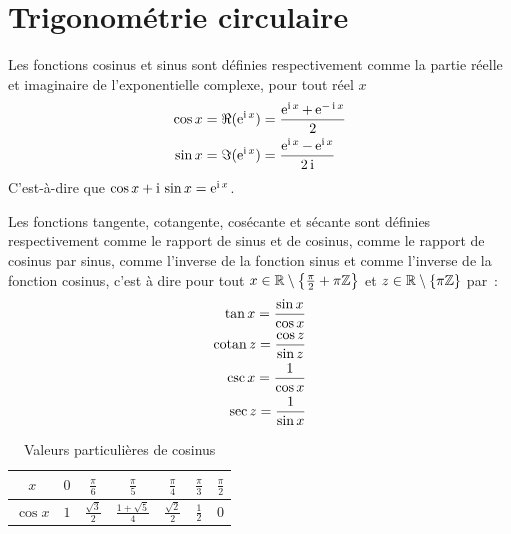\section{Trigonométrie circulaire}\label{sec:chap1-trigocirc}

\begin{defdef}
  Les fonctions cosinus et sinus sont définies respectivement comme la
  partie réelle et imaginaire de l'exponentielle complexe, pour tout réel
  \(x\)
  \begin{align*}
    \cos{x} &= \Re(\operatorname{e}^{\operatorname{i}{}x}) = \frac{\operatorname{e}^{\operatorname{i}{}x}+\operatorname{e}^{-\operatorname{i}{}x}}{2} \\
    \sin{x} & = \Im(\operatorname{e}^{\operatorname{i}{}x}) = \frac{\operatorname{e}^{\operatorname{i}{}x}-\operatorname{e}^{\operatorname{i}{}x}}{2\operatorname{i}}
  \end{align*}
  C'est-à-dire que \(\cos x +\operatorname{i}{}\sin x = \operatorname{e}^{\operatorname{i}{}x}\).
\end{defdef}

\begin{defdef}
  Les fonctions tangente, cotangente, cosécante et sécante sont définies
  respectivement comme le rapport de sinus et de cosinus, comme le rapport
  de cosinus par sinus, comme l'inverse de la fonction sinus et comme
  l'inverse de la fonction cosinus, c'est à dire pour tout \(x \in
  \mathbb{R}\setminus\left\{\frac{\pi}{2}+\pi\mathbb{Z}\right\}\) et \(z \in
  \mathbb{R}\setminus\left\{\pi\mathbb{Z} \right\}\) par~:
  \begin{align}
    \tan{x} = \frac{\sin{x}}{\cos{x}} \\ \operatorname{cotan}{z} = \frac{\cos{z}}{\sin{z}} \\
    \csc{x} = \frac{1}{\cos{x}} \\ \sec{z} = \frac{1}{\sin{x}}
  \end{align}
\end{defdef}

\renewcommand{\arraystretch}{1.5}
\begin{table}
  \centering
  \begin{tabular}{ccccccc}
    \toprule
    \(x\)      & \(0\) &\(\frac{\pi}{6}\) & \(\frac{\pi}{5}\)&
    \(\frac{\pi}{4}\)      & \(\frac{\pi}{3}\)      & \(\frac{\pi}{2}\)\\
    \midrule
    \(\cos x\) & \(1\) &\(\frac{\sqrt{3}}{2}\)  &\(\frac{1+\sqrt{5}}{4}\) &
    \(\frac{\sqrt{2}}{2}\) & \(\frac{1}{2}\) & \(0\)\\
    \bottomrule
  \end{tabular}
  \caption{Valeurs particulières de cosinus}\label{tab:valeurpart}
\end{table}
\renewcommand{\arraystretch}{1}

